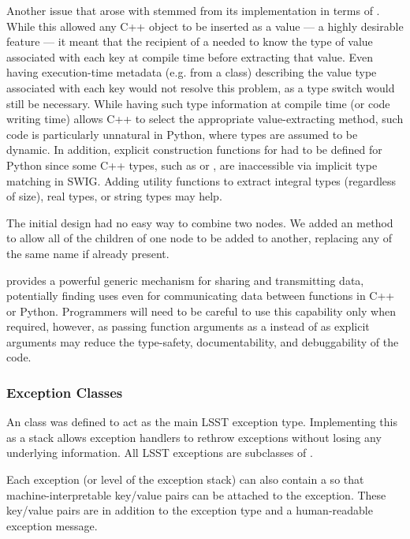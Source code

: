 Another issue that arose with  stemmed from its
implementation in terms of .  While this allowed any
C++ object to be inserted as a value --- a highly desirable feature --- it
meant that the recipient of a  needed to know the type of
value associated with each key at compile time before extracting that
value.  Even having execution-time metadata (e.g. from a 
class) describing the value type
associated with each key would not resolve this problem, as a type
switch would still be necessary.  While having such type information at
compile time (or code writing time) allows C++ to select the appropriate
value-extracting method, such code is particularly unnatural in Python,
where types are assumed to be dynamic.  In addition, explicit
construction functions for  had to be defined for Python
since some C++ types, such as  or , are
inaccessible via implicit type matching in SWIG.  Adding utility
functions to extract integral types (regardless of size), real types, or
string types may help.

The initial  design had no easy way to combine two 
nodes.  We added an  method to allow all of the
children of one node to be added to another, replacing any of the same
name if already present.

 provides a powerful generic mechanism for sharing and
transmitting data, potentially finding uses even for communicating data
between functions in C++ or Python.  Programmers will need to be careful
to use this capability only when required, however, as passing function
arguments as a  instead of as explicit arguments may reduce
the type-safety, documentability, and debuggability of the code.

\subsubsection{Exception Classes}

An  class was defined to act as the main LSST exception
type.  Implementing this as a stack allows exception handlers to rethrow
exceptions without losing any underlying information.  All LSST
exceptions are subclasses of .

Each exception (or level of the exception stack) can also contain a
 so that machine-interpretable key/value pairs can be
attached to the exception.  These key/value pairs are in addition to
the exception type and a human-readable exception message.


